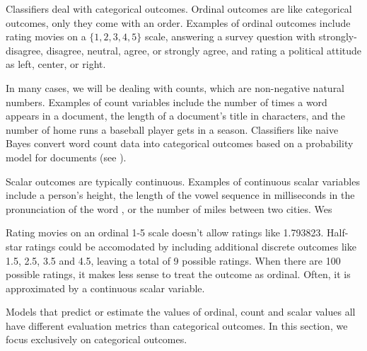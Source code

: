 Classifiers deal with categorical outcomes.  Ordinal outcomes are like
categorical outcomes, only they come with an order.  Examples of
ordinal outcomes include rating movies on a $\{ 1, 2, 3, 4, 5 \}$
scale, answering a survey question with strongly-disagree, disagree,
neutral, agree, or strongly agree, and rating a political attitude as
left, center, or right.

In many cases, we will be dealing with counts, which are non-negative
natural numbers.  Examples of count variables include the number of
times a word appears in a document, the length of a document's title
in characters, and the number of home runs a baseball player gets in a
season.  Classifiers like naive Bayes convert word count data into
categorical outcomes based on a probability model for documents (see
).

Scalar outcomes are typically continuous.  Examples of continuous
scalar variables include a person's height, the length of the vowel
sequence in milliseconds in the pronunciation of the word
, or the number of miles between two cities.  Wes

Rating movies on an ordinal 1-5 scale doesn't allow ratings like
1.793823.  Half-star ratings could be accomodated by including
additional discrete outcomes like 1.5, 2.5, 3.5 and 4.5, leaving a
total of 9 possible ratings.  When there are 100 possible ratings, it
makes less sense to treat the outcome as ordinal.  Often, it is
approximated by a continuous scalar variable.

Models that predict or estimate the values of ordinal, count and
scalar values all have different evaluation metrics than categorical
outcomes.  In this section, we focus exclusively on categorical
outcomes.

